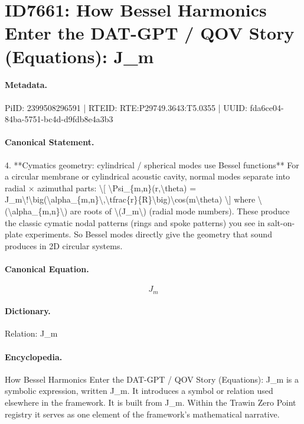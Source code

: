 \section*{ID7661: How Bessel Harmonics Enter the DAT-GPT / QOV Story (Equations): J\_m}
\paragraph{Metadata.}
PiID: 2399508296591 | RTEID: RTE:P29749.3643:T5.0355 | UUID: fda6ce04-84ba-5751-bc4d-d9fdb8e4a3b3

\paragraph{Canonical Statement.}
4. **Cymatics geometry: cylindrical / spherical modes use Bessel functions** For a circular membrane or cylindrical acoustic cavity, normal modes separate into radial × azimuthal parts: \textbackslash{}[ \textbackslash{}Psi\_\{m,n\}(r,\textbackslash{}theta) = J\_m\textbackslash{}!\textbackslash{}big(\textbackslash{}alpha\_\{m,n\}\textbackslash{},\textbackslash{}tfrac\{r\}\{R\}\textbackslash{}big)\textbackslash{}cos(m\textbackslash{}theta) \textbackslash{}] where \textbackslash{}(\textbackslash{}alpha\_\{m,n\}\textbackslash{}) are roots of \textbackslash{}(J\_m\textbackslash{}) (radial mode numbers). These produce the classic cymatic nodal patterns (rings and spoke patterns) you see in salt-on-plate experiments. So Bessel modes directly give the geometry that sound produces in 2D circular systems.

\paragraph{Canonical Equation.}
\[
J_m
\]

\paragraph{Dictionary.}
Relation: J\_m

\paragraph{Encyclopedia.}
How Bessel Harmonics Enter the DAT-GPT / QOV Story (Equations): J\_m is a symbolic expression, written J\_m. It introduces a symbol or relation used elsewhere in the framework. It is built from J\_m. Within the Trawin Zero Point registry it serves as one element of the framework's mathematical narrative.
